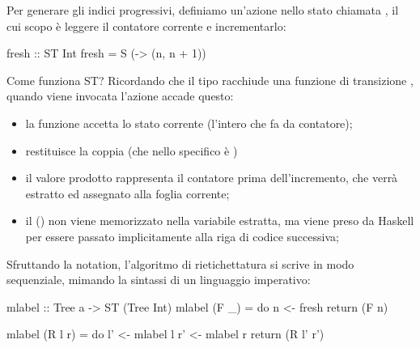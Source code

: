 Per generare gli indici progressivi, definiamo un'azione nello stato chiamata , il cui scopo è leggere il contatore corrente e incrementarlo:
\begin{haskellbox}{}
fresh :: ST Int
fresh = S (\n -> (n, n + 1))
\end{haskellbox}

\begin{gframe}{Come funziona ST?}
Ricordando che il tipo  racchiude una funzione di transizione , quando viene invocata l'azione  accade questo:
\begin{itemize}
    \item la funzione accetta lo stato corrente  (l'intero che fa da contatore);
    \item restituisce la coppia 
        \subitem (che nello specifico è )
    \item il valore prodotto  rappresenta il contatore prima dell'incremento, che verrà estratto ed assegnato alla foglia corrente;
    \item il  () non viene memorizzato nella variabile estratta, ma viene preso da Haskell per essere passato implicitamente alla riga di codice successiva;
\end{itemize}
   
\end{gframe}

Sfruttando la  notation, l'algoritmo di rietichettatura si scrive in modo sequenziale, mimando la sintassi di un linguaggio imperativo:
\begin{haskellbox}{}
mlabel :: Tree a -> ST (Tree Int)
mlabel (F _) = do 
  n <- fresh
  return (F n)

mlabel (R l r) = do 
  l' <- mlabel l
  r' <- mlabel r
  return (R l' r')
\end{haskellbox}

